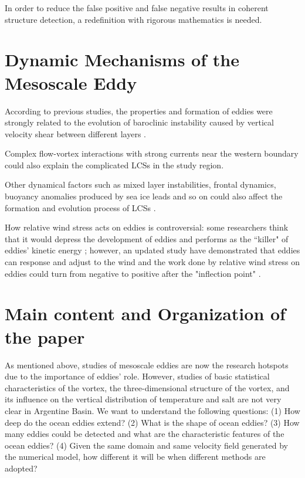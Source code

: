 In order to reduce the false positive and false negative results in coherent structure detection, a redefinition with rigorous mathematics is needed. 

\clearpage

\section{Dynamic Mechanisms of the  Mesoscale Eddy}

According to previous studies, the properties and formation of eddies were strongly related to the evolution of baroclinic instability caused by vertical velocity shear between different layers \cite{feng2021four,verma2021lagrangian}.


Complex flow-vortex interactions with strong currents near the western boundary could also explain the complicated LCSs in the study region.
 
Other dynamical factors such as mixed layer instabilities, frontal dynamics, buoyancy anomalies produced by sea ice leads and so on could also affect the formation and evolution process of LCSs \cite{mukiibi2016three,cohanim2021dynamics}.

How relative wind stress acts on eddies is controversial: some researchers think that it would depress the development of eddies and performs as the ``killer" of eddies' kinetic energy \cite{xu2016work,renault2019remarkable}; however, an updated study have demonstrated that eddies can response and adjust to the wind and the work done by relative wind stress on eddies could turn from negative to positive after the "inflection point" \cite{teng2021does}.

\clearpage

\section{Main content and Organization of the paper}

As mentioned above, studies of mesoscale eddies are now the research hotspots due to the importance of eddies' role. However, studies of basic statistical characteristics of the vortex, the three-dimensional structure of the vortex, and its influence on the vertical distribution of temperature and salt are not very clear in Argentine Basin. We want to understand the following questions: (1) How deep do the ocean eddies extend? (2) What is the shape of ocean eddies? (3) How many eddies could be detected and what are the characteristic features of the ocean eddies? (4) Given the same domain and same velocity field generated by the numerical model, how different it will be when different methods are adopted?


